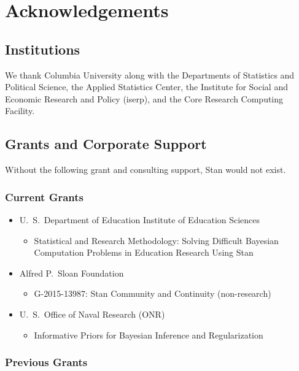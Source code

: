 \chapter*{Acknowledgements}

\section*{Institutions}

We thank Columbia University along with the Departments of
Statistics and Political Science, the Applied Statistics Center, the
Institute for Social and Economic Research and Policy ({\sc iserp}),
and the Core Research Computing Facility.

\section*{Grants and Corporate Support}

Without the following grant and consulting support, Stan would not exist.

\subsection*{Current Grants}

\begin{itemize}
\item 
 U.~S.\ Department of Education Institute of Education Sciences
\begin{itemize}\small
\item Statistical and Research Methodology: Solving
Difficult Bayesian Computation Problems in Education Research Using Stan
\end{itemize}
\item  Alfred P.\ Sloan Foundation
\begin{itemize}\small
\item G-2015-13987: Stan Community and Continuity (non-research)
\end{itemize}
\item U.~S.\ Office of Naval Research (ONR)
\begin{itemize}\small
\item Informative Priors for Bayesian Inference and Regularization
\end{itemize}
\end{itemize}
%


\subsection*{Previous Grants}

